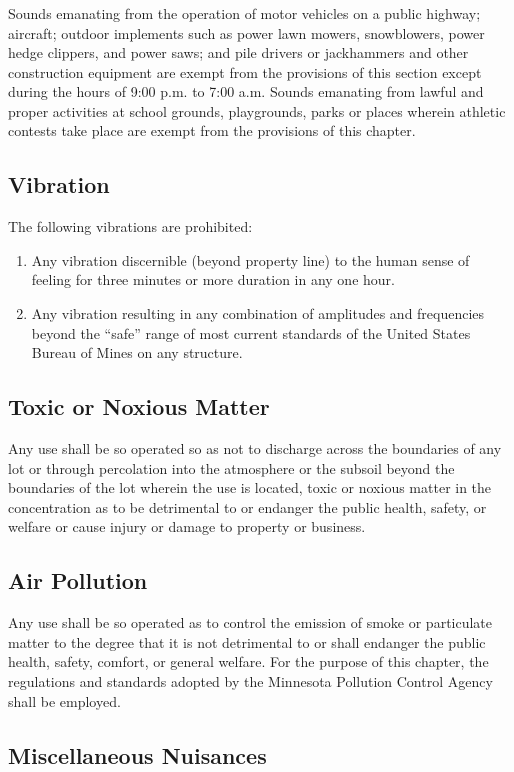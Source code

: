 \subsubsection{}
Sounds emanating from the operation of motor vehicles on a public highway; aircraft; outdoor implements such as power lawn mowers, snowblowers, power hedge clippers, and power saws; and pile drivers or jackhammers and other construction equipment are exempt from the provisions of this section except during the hours of 9:00 p.m. to 7:00 a.m. Sounds emanating from lawful and proper activities at school grounds, playgrounds, parks or places wherein athletic contests take place are exempt from the provisions of this chapter.
\subsection{Vibration}
The following vibrations are prohibited:
\begin{enumerate}[{\indent}1)]
    \item Any vibration discernible (beyond property line) to the human sense of feeling for three minutes or more duration in any one hour.
    \item Any vibration resulting in any combination of amplitudes and frequencies beyond the “safe” range of most current standards of the United States Bureau of Mines on any structure.
\end{enumerate}
\subsection{Toxic or Noxious Matter}
Any use shall be so operated so as not to discharge across the boundaries of any lot or through percolation into the atmosphere or the subsoil beyond the boundaries of the lot wherein the use is located, toxic or noxious matter in the concentration as to be detrimental to or endanger the public health, safety, or welfare or cause injury or damage to property or business.
\subsection{Air Pollution}
Any use shall be so operated as to control the emission of smoke or particulate matter to the degree that it is not detrimental to or shall endanger the public health, safety, comfort, or general welfare. For the purpose of this chapter, the regulations and standards adopted by the Minnesota Pollution Control Agency shall be employed.
\subsection{Miscellaneous Nuisances}
